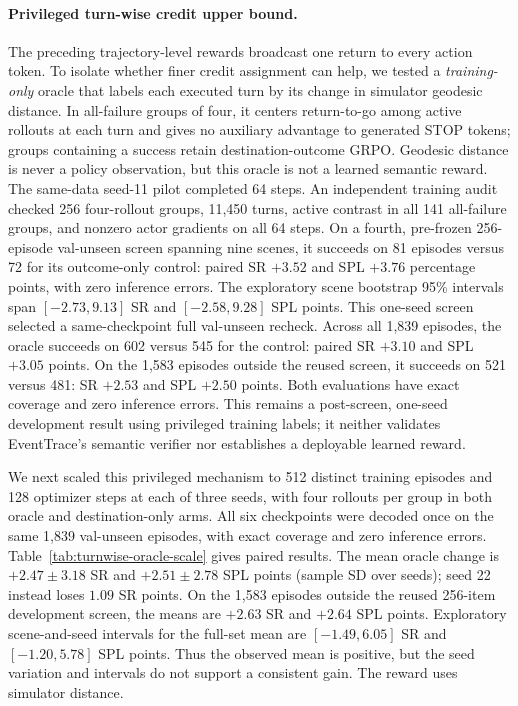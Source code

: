 \documentclass[10pt,twocolumn,letterpaper]{article}
\begin{document}
\paragraph{Privileged turn-wise credit upper bound.} The preceding
trajectory-level rewards broadcast one return to every action token. To
isolate whether finer credit assignment can help, we tested a
\emph{training-only} oracle that labels each executed turn by its change
in simulator geodesic distance. In all-failure groups of four, it
centers return-to-go among active rollouts at each turn and gives no
auxiliary advantage to generated STOP tokens; groups containing a
success retain destination-outcome GRPO. Geodesic distance is never a
policy observation, but this oracle is not a learned semantic reward.
The same-data seed-11 pilot completed 64 steps. An independent training
audit checked 256 four-rollout groups, 11,450 turns, active contrast in
all 141 all-failure groups, and nonzero actor gradients on all 64
steps. On a fourth, pre-frozen 256-episode val-unseen screen spanning
nine scenes, it succeeds on 81 episodes versus 72 for its outcome-only
control: paired SR $+3.52$ and SPL $+3.76$ percentage points, with
zero inference errors. The exploratory scene bootstrap 95\% intervals
span $[-2.73,9.13]$ SR and $[-2.58,9.28]$ SPL points. This one-seed
screen selected a same-checkpoint full val-unseen recheck. Across all
1,839 episodes, the oracle succeeds on 602 versus 545 for the control:
paired SR $+3.10$ and SPL $+3.05$ points. On the 1,583 episodes outside
the reused screen, it succeeds on 521 versus 481: SR $+2.53$ and SPL
$+2.50$ points. Both evaluations have exact coverage and zero inference
errors. This remains a post-screen, one-seed development result using
privileged training labels; it neither validates EventTrace's semantic
verifier nor establishes a deployable learned reward.

We next scaled this privileged mechanism to 512 distinct training episodes
and 128 optimizer steps at each of three seeds, with four rollouts per group
in both oracle and destination-only arms. All six checkpoints were decoded
once on the same 1,839 val-unseen episodes, with exact coverage and zero
inference errors. Table~\ref{tab:turnwise-oracle-scale} gives paired
results. The mean oracle change is $+2.47\pm3.18$ SR and
$+2.51\pm2.78$ SPL points (sample SD over seeds); seed 22 instead
loses $1.09$ SR points. On the 1,583 episodes outside the reused
256-item development screen, the means are $+2.63$ SR and $+2.64$
SPL points. Exploratory scene-and-seed intervals for the full-set
mean are $[-1.49,6.05]$ SR and $[-1.20,5.78]$ SPL points. Thus the
observed mean is positive, but the seed variation and intervals do not
support a consistent gain. The reward uses simulator distance.
\end{document}
